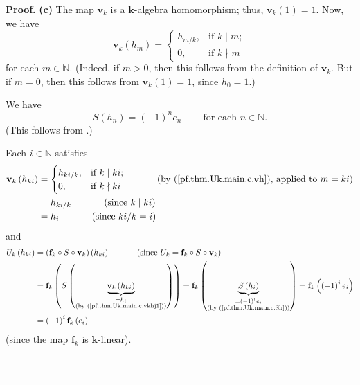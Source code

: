 \documentclass[numbers=enddot,12pt,final,onecolumn,notitlepage]{scrartcl}%
\theoremstyle{definition}
\newenvironment{proof}[1][Proof]{\noindent\textbf{#1.} }{\ \rule{0.5em}{0.5em}}
\begin{document}
\begin{proof}
\textbf{(c)} The map $\mathbf{v}_{k}$ is a $\mathbf{k}$-algebra homomorphism;
thus, $\mathbf{v}_{k}\left(  1\right)  =1$. Now, we have%
\begin{equation}
\mathbf{v}_{k}\left(  h_{m}\right)  =%
\begin{cases}
h_{m/k}, & \text{if }k\mid m;\\
0, & \text{if }k\nmid m
\end{cases}
\label{pf.thm.Uk.main.c.vh}%
\end{equation}
for each $m\in\mathbb{N}$. (Indeed, if $m>0$, then this follows from the
definition of $\mathbf{v}_{k}$. But if $m=0$, then this follows from
$\mathbf{v}_{k}\left(  1\right)  =1$, since $h_{0}=1$.)

We have%
\begin{equation}
S\left(  h_{n}\right)  =\left(  -1\right)  ^{n}e_{n}%
\ \ \ \ \ \ \ \ \ \ \text{for each }n\in\mathbb{N}.
\label{pf.thm.Uk.main.c.Sh}%
\end{equation}
(This follows from \cite[Proposition 2.4.1(iii)]{GriRei}.)

Each $i\in\mathbb{N}$ satisfies%
\begin{align}
\mathbf{v}_{k}\left(  h_{ki}\right)   &  =%
\begin{cases}
h_{ki/k}, & \text{if }k\mid ki;\\
0, & \text{if }k\nmid ki
\end{cases}
\ \ \ \ \ \ \ \ \ \ \left(  \text{by (\ref{pf.thm.Uk.main.c.vh}), applied to
}m=ki\right) \nonumber\\
&  =h_{ki/k}\ \ \ \ \ \ \ \ \ \ \left(  \text{since }k\mid ki\right)
\nonumber\\
&  =h_{i}\ \ \ \ \ \ \ \ \ \ \left(  \text{since }ki/k=i\right)
\label{pf.thm.Uk.main.c.vkhj1}%
\end{align}
and
\begin{align}
U_{k}\left(  h_{ki}\right)   &  =\left(  \mathbf{f}_{k}\circ S\circ
\mathbf{v}_{k}\right)  \left(  h_{ki}\right)  \ \ \ \ \ \ \ \ \ \ \left(
\text{since }U_{k}=\mathbf{f}_{k}\circ S\circ\mathbf{v}_{k}\right) \nonumber\\
&  =\mathbf{f}_{k}\left(  S\left(  \underbrace{\mathbf{v}_{k}\left(
h_{ki}\right)  }_{\substack{=h_{i}\\\text{(by (\ref{pf.thm.Uk.main.c.vkhj1}%
))}}}\right)  \right)  =\mathbf{f}_{k}\left(  \underbrace{S\left(
h_{i}\right)  }_{\substack{=\left(  -1\right)  ^{i}e_{i}\\\text{(by
(\ref{pf.thm.Uk.main.c.Sh}))}}}\right)  =\mathbf{f}_{k}\left(  \left(
-1\right)  ^{i}e_{i}\right) \nonumber\\
&  =\left(  -1\right)  ^{i}\mathbf{f}_{k}\left(  e_{i}\right)
\label{pf.thm.Uk.main.c.Ukhj1}%
\end{align}
(since the map $\mathbf{f}_{k}$ is $\mathbf{k}$-linear).


\end{proof}
\end{document}
